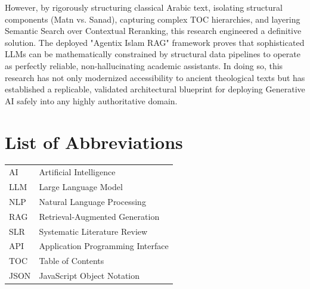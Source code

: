 \documentclass[12pt, a4paper]{report}
\begin{document}
However, by rigorously structuring classical Arabic text, isolating structural components (Matn vs. Sanad), capturing complex TOC hierarchies, and layering Semantic Search over Contextual Reranking, this research engineered a definitive solution. The deployed "Agentix Islam RAG" framework proves that sophisticated LLMs can be mathematically constrained by structural data pipelines to operate as perfectly reliable, non-hallucinating academic assistants. In doing so, this research has not only modernized accessibility to ancient theological texts but has established a replicable, validated architectural blueprint for deploying Generative AI safely into any highly authoritative domain.

\newpage
\printbibliography

\newpage
\listoffigures
\newpage
\listoftables
\newpage

\chapter*{List of Abbreviations}
\begin{tabular}{ll}
AI & Artificial Intelligence \\
LLM & Large Language Model \\
NLP & Natural Language Processing \\
RAG & Retrieval-Augmented Generation \\
SLR & Systematic Literature Review \\
API & Application Programming Interface \\
TOC & Table of Contents \\
JSON & JavaScript Object Notation \\
\end{tabular}
\end{document}
